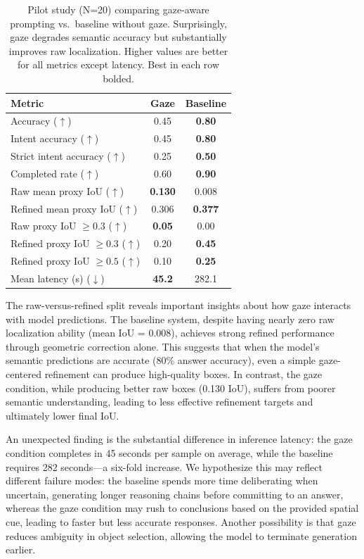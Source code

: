 \documentclass[11pt]{article}
\begin{document}
\begin{table}[t]
\centering
\small
\begin{tabular}{lcc}
\toprule
\textbf{Metric} & \textbf{Gaze} & \textbf{Baseline} \\
\midrule
Accuracy ($\uparrow$) & 0.45 & \textbf{0.80} \\
Intent accuracy ($\uparrow$) & 0.45 & \textbf{0.80} \\
Strict intent accuracy ($\uparrow$) & 0.25 & \textbf{0.50} \\
Completed rate ($\uparrow$) & 0.60 & \textbf{0.90} \\
Raw mean proxy IoU ($\uparrow$) & \textbf{0.130} & 0.008 \\
Refined mean proxy IoU ($\uparrow$) & 0.306 & \textbf{0.377} \\
Raw proxy IoU $\ge 0.3$ ($\uparrow$) & \textbf{0.05} & 0.00 \\
Refined proxy IoU $\ge 0.3$ ($\uparrow$) & 0.20 & \textbf{0.45} \\
Refined proxy IoU $\ge 0.5$ ($\uparrow$) & 0.10 & \textbf{0.25} \\
Mean latency (s) ($\downarrow$) & \textbf{45.2} & 282.1 \\
\bottomrule
\end{tabular}
\caption{Pilot study (N=20) comparing gaze-aware prompting vs.\ baseline without gaze. Surprisingly, gaze degrades semantic accuracy but substantially improves raw localization. Higher values are better for all metrics except latency. Best in each row bolded.}
\label{tab:main-results}
\end{table}

The raw-versus-refined split reveals important insights about how gaze interacts with model predictions. The baseline system, despite having nearly zero raw localization ability (mean IoU = 0.008), achieves strong refined performance through geometric correction alone. This suggests that when the model's semantic predictions are accurate (80\% answer accuracy), even a simple gaze-centered refinement can produce high-quality boxes. In contrast, the gaze condition, while producing better raw boxes (0.130 IoU), suffers from poorer semantic understanding, leading to less effective refinement targets and ultimately lower final IoU.

An unexpected finding is the substantial difference in inference latency: the gaze condition completes in 45 seconds per sample on average, while the baseline requires 282 seconds---a six-fold increase. We hypothesize this may reflect different failure modes: the baseline spends more time deliberating when uncertain, generating longer reasoning chains before committing to an answer, whereas the gaze condition may rush to conclusions based on the provided spatial cue, leading to faster but less accurate responses. Another possibility is that gaze reduces ambiguity in object selection, allowing the model to terminate generation earlier.
\end{document}
